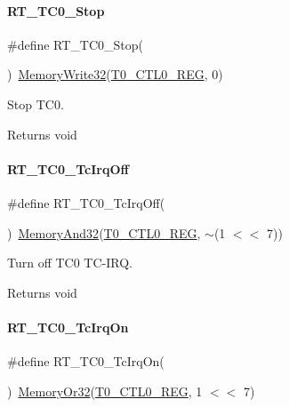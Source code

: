 \paragraph{\texorpdfstring{R\+T\+\_\+\+T\+C0\+\_\+\+Stop}{RT\_TC0\_Stop}}
{\footnotesize\ttfamily \#define R\+T\+\_\+\+T\+C0\+\_\+\+Stop(\begin{DoxyParamCaption}{ }\end{DoxyParamCaption})~\mbox{\hyperlink{a00020_a6b9732365b12e48ddb89fe1028b975b0}{Memory\+Write32}}(\mbox{\hyperlink{a00020_adadaa0ab1ebbd7ba9b70dfd24c3ed44da869abf9d87f78f45a0e07ad352abb39e}{T0\+\_\+\+C\+T\+L0\+\_\+\+R\+EG}}, 0)}



Stop T\+C0. 

\begin{DoxyReturn}{Returns}
void 
\end{DoxyReturn}
\mbox{\label{a00041_a7434ed75487de93c69569c05430967ae}} 
\paragraph{\texorpdfstring{R\+T\+\_\+\+T\+C0\+\_\+\+Tc\+Irq\+Off}{RT\_TC0\_TcIrqOff}}
{\footnotesize\ttfamily \#define R\+T\+\_\+\+T\+C0\+\_\+\+Tc\+Irq\+Off(\begin{DoxyParamCaption}{ }\end{DoxyParamCaption})~\mbox{\hyperlink{a00020_ad87cedffcaadc51db22594fce55173d4}{Memory\+And32}}(\mbox{\hyperlink{a00020_adadaa0ab1ebbd7ba9b70dfd24c3ed44da869abf9d87f78f45a0e07ad352abb39e}{T0\+\_\+\+C\+T\+L0\+\_\+\+R\+EG}}, $\sim$(1 $<$$<$ 7))}



Turn off T\+C0 T\+C-\/\+I\+RQ. 

\begin{DoxyReturn}{Returns}
void 
\end{DoxyReturn}
\mbox{\label{a00041_a1ff15e860147b3fff582b7603ba7ffa8}} 
\paragraph{\texorpdfstring{R\+T\+\_\+\+T\+C0\+\_\+\+Tc\+Irq\+On}{RT\_TC0\_TcIrqOn}}
{\footnotesize\ttfamily \#define R\+T\+\_\+\+T\+C0\+\_\+\+Tc\+Irq\+On(\begin{DoxyParamCaption}{ }\end{DoxyParamCaption})~\mbox{\hyperlink{a00020_a27874a97deab7cecdde5ddecf466e31e}{Memory\+Or32}}(\mbox{\hyperlink{a00020_adadaa0ab1ebbd7ba9b70dfd24c3ed44da869abf9d87f78f45a0e07ad352abb39e}{T0\+\_\+\+C\+T\+L0\+\_\+\+R\+EG}}, 1 $<$$<$ 7)}



